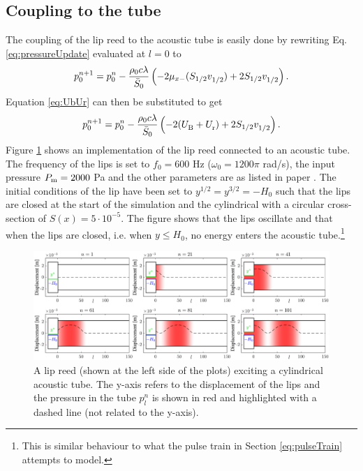 \subsection{Coupling to the tube}\label{sec:lipreedTube}
The coupling of the lip reed to the acoustic tube is easily done by rewriting Eq. \eqref{eq:pressureUpdate} evaluated at $l=0$ to
\begin{equation}\label{eq:tubeCoupling}
    p^{n+1}_0 = p_0^n - \frac{\rho_0c\lambda}{\bar S_0}\left(-2\mu_{x-}(S_{1/2}v_{1/2}^{}) + 2 S_{1/2}v_{1/2}^{}\right).
\end{equation}
Equation \eqref{eq:UbUr} can then be substituted to get
\begin{equation}\label{eq:pressureCoupled}
    p^{n+1}_0 = p_0^n - \frac{\rho_0c\lambda}{\bar S_0}\left(-2(U_\text{B}^{} + U_\text{r}^{}) + 2 S_{1/2}v_{1/2}^{}\right).
\end{equation}
Figure \ref{fig:lipreedTube} shows an implementation of the lip reed connected to an acoustic tube. The frequency of the lips is set to $f_0 = 600$ Hz ($\omega_0 = 1200\pi$ rad/s), the input pressure $P_{\text{m}} = 2000$ Pa and the other parameters are as listed in paper \citeP[H]. The initial conditions of the lip have been set to $y^{1/2} = y^{3/2} = -H_0$ such that the lips are closed at the start of the simulation and the cylindrical with a circular cross-section of $S(x) = 5\cdot 10^{-5}$. The figure shows that the lips oscillate and that when the lips are closed, i.e. when $y \leq H_0$, no energy enters the acoustic tube.\footnote{This is similar behaviour to what the pulse train in Section \ref{eq:pulseTrain} attempts to model.}


\begin{figure}[h]
    \centering
    \includegraphics[width=\textwidth]{figures/exciters/lipreed/lipreedImplementation.eps}
    \caption{A lip reed (shown at the left side of the plots) exciting a cylindrical acoustic tube. The y-axis refers to the displacement of the lips and the pressure in the tube $p_l^n$ is shown in red and highlighted with a dashed line (not related to the y-axis).\label{fig:lipreedTube}}
\end{figure}
